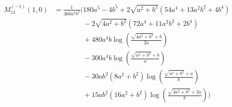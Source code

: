 \begin{align*}
M^{(-1)}_{11}(1,0) &= \frac{1}{360 a^{4} b^{2}}\Bigg(180 a^{5} - 4 b^{5} + 2 \sqrt{a^{2} + b^{2}}\left(54 a^{4} + 13 a^{2} b^{2} + 4 b^{4}\right)\\
&\phantom{{}=\frac{1}{360 a^{4} b^{2}}\Bigg(}- 2 \sqrt{4 a^{2} + b^{2}}\left(72 a^{4} + 11 a^{2} b^{2} + 2 b^{4}\right)\\
&\phantom{{}=\frac{1}{360 a^{4} b^{2}}\Bigg(}+ 480 a^{4} b \log\left(\frac{\sqrt{4 a^{2} + b^{2}} + b}{2 a}\right)\\
&\phantom{{}=\frac{1}{360 a^{4} b^{2}}\Bigg(}- 300 a^{4} b \log\left(\frac{\sqrt{a^{2} + b^{2}} + b}{a}\right)\\
&\phantom{{}=\frac{1}{360 a^{4} b^{2}}\Bigg(}- 30 a b^{2} \left(8 a^{2} + b^{2}\right) \log\left(\frac{\sqrt{a^{2} + b^{2}} + a}{b}\right)\\
&\phantom{{}=\frac{1}{360 a^{4} b^{2}}\Bigg(}+ 15 a b^{2} \left(16 a^{2} + b^{2}\right) \log\left(\frac{\sqrt{4 a^{2} + b^{2}} + 2 a}{b}\right)\Bigg)
\end{align*}
